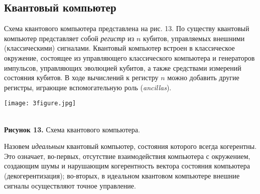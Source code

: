 \begin{multicols}{2}
    \section*{Квантовый компьютер} 
    \normalsize{
    Схема квантового компьютера представлена на рис. 13.
    По существу квантовый компьютер представляет собой \emph{регистр} из $n$ кубитов,
    управляемых внешними (классическими) сигналами. Квантовый компьютер встроен в классическое
    окружение, состоящее из управляющего классического компьютера и генераторов импульсов,
    управляющих эволюцией кубитов, а также средствами измерений состояния кубитов. В ходе вычислений к регистру $n$ можно добавить другие
    регистры, играющие вспомогательную роль (\emph{ancillas}).
    }\\
    \begin{flushleft}
        \begin{minipage}{0.3\textwidth}{\texttt{[image: 3figure.jpg]}}
        \end{minipage}\\
        \vspace{0.3cm}
        \footnotesize{\textbf{Рисунок 13.} Схема квантового компьютера.}
    \end{flushleft}
    \normalsize{
    Назовем \emph{идеальным} квантовый компьютер, состояния которого всегда когерентны. Это означает, во-первых, отсутствие взаимодействия компьютера
    с окружением, создающим шумы и нарушающим когерентность вектора состояния компьютера (декогерентизация); во-вторых, в идеальном квантовом компьютере
    внешние сигналы осуществляют точное управление.

}
\end{multicols}
